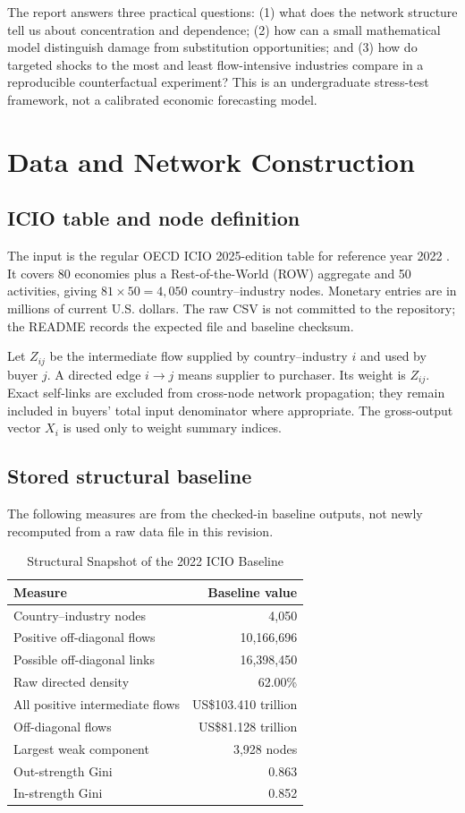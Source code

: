 \documentclass[conference,a4paper,twoside]{IEEEtran}
\begin{document}
The report answers three practical questions: (1) what does the network structure tell us about concentration and dependence; (2) how can a small mathematical model distinguish damage from substitution opportunities; and (3) how do targeted shocks to the most and least flow-intensive industries compare in a reproducible counterfactual experiment? This is an undergraduate stress-test framework, not a calibrated economic forecasting model.

\section{Data and Network Construction}
\subsection{ICIO table and node definition}
The input is the regular OECD ICIO 2025-edition table for reference year 2022 \cite{oecd}. It covers 80 economies plus a Rest-of-the-World (ROW) aggregate and 50 activities, giving $81\times50=4{,}050$ country--industry nodes. Monetary entries are in millions of current U.S. dollars. The raw CSV is not committed to the repository; the README records the expected file and baseline checksum.

Let $Z_{ij}$ be the intermediate flow supplied by country--industry $i$ and used by buyer $j$. A directed edge $i\to j$ means supplier to purchaser. Its weight is $Z_{ij}$. Exact self-links are excluded from cross-node network propagation; they remain included in buyers' total input denominator where appropriate. The gross-output vector $X_i$ is used only to weight summary indices.

\subsection{Stored structural baseline}
The following measures are from the checked-in baseline outputs, not newly recomputed from a raw data file in this revision.
\begin{table}[t]
\caption{Structural Snapshot of the 2022 ICIO Baseline}
\label{tab:struct}
\centering\footnotesize
\begin{tabular}{lr}
\toprule
Measure & Baseline value \\
\midrule
Country--industry nodes & 4,050 \\
Positive off-diagonal flows & 10,166,696 \\
Possible off-diagonal links & 16,398,450 \\
Raw directed density & 62.00\% \\
All positive intermediate flows & US\$103.410 trillion \\
Off-diagonal flows & US\$81.128 trillion \\
Largest weak component & 3,928 nodes \\
Out-strength Gini & 0.863 \\
In-strength Gini & 0.852 \\
\bottomrule
\end{tabular}
\end{table}
\end{document}

